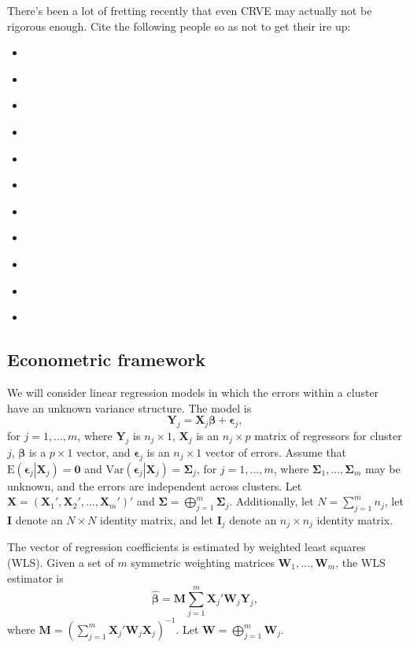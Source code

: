 \documentclass[12pt]{article}\usepackage[]{graphicx}\usepackage[]{color}
\newcommand{\E}{\text{E}}
\newcommand{\Var}{\text{Var}}
\newcommand{\bm}{\mathbf}
\newcommand{\bs}{\boldsymbol}
\begin{document}
There's been a lot of fretting recently that even CRVE may actually not be rigorous enough. Cite the following people so as not to get their ire up:
\begin{itemize}
\item \citet{Brewer2013inference}
\item \citet{Cameron2008bootstrap}
\item \citet{Cameron2015practitioners}
\item \citet{Carter2013asymptotic}
\item \citet{Ibragimov2010tstatistic}
\item \citet{Imbens2012robust}
\item \citet{Kezdi2004robust}
\item \citet{McCaffrey2001generalizations, Bell2002bias}
\item \citet{McCaffrey2006improved}
\item \citet{Webb2013wild}
\item \citet{Kline2012score}
\end{itemize}

\subsection{Econometric framework}

We will consider linear regression models in which the errors within a cluster have an unknown variance structure. 
The model is
\begin{equation}
\label{eq:model_vector}
\bm{Y}_j = \bm{X}_j \bs\beta + \bs\epsilon_j,
\end{equation}
for $j=1,...,m$, where $\bm{Y}_j$ is $n_j \times 1$, $\bm{X}_j$ is an $n_j \times p$ matrix of regressors for cluster $j$, $\bs\beta$ is a $p \times 1$ vector, and $\bs\epsilon_j$ is an $n_j \times 1$ vector of errors. 
Assume that $\E\left(\bs\epsilon_j\left|\bm{X}_j\right.\right) = \bm{0}$ and $\Var\left(\bs\epsilon_j\left|\bm{X}_j\right.\right) = \bs\Sigma_j$, for $j = 1,...,m$, where $\bs\Sigma_1,...,\bs\Sigma_m$ may be unknown, and the errors are independent across clusters. 
Let $\bm{X} = \left(\bm{X}_1',\bm{X}_2',...,\bm{X}_m'\right)'$ and $\bs\Sigma = \bigoplus_{j=1}^m \bs\Sigma_j$. Additionally, let $N = \sum_{j=1}^m n_j$, let $\bm{I}$ denote an $N \times N$ identity matrix, and let $\bm{I}_j$ denote an $n_j \times n_j$ identity matrix.

The vector of regression coefficients is estimated by weighted least squares (WLS). 
Given a set of $m$ symmetric weighting matrices $\bm{W}_1,...,\bm{W}_m$, the WLS estimator is 
\begin{equation}
\label{eq:WLS}
\bs{\hat\beta} = \bm{M} \sum_{j=1}^m \bm{X}_j' \bm{W}_j \bm{Y}_j, 
\end{equation}
where $\bm{M} = \left(\sum_{j=1}^m \bm{X}_j' \bm{W}_j \bm{X}_j\right)^{-1}$. Let $\bm{W} = \bigoplus_{j=1}^m \bm{W}_j$. 
\end{document}
